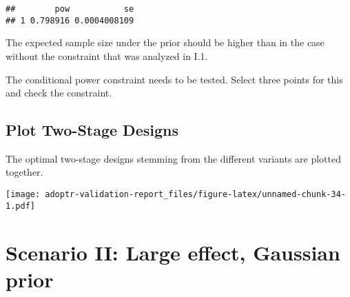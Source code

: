 \documentclass[]{book}
\newenvironment{Shaded}{\begin{snugshade}}{\end{snugshade}}
\newcommand{\ControlFlowTok}[1]{\textcolor[rgb]{0.13,0.29,0.53}{\textbf{#1}}}
\newcommand{\DecValTok}[1]{\textcolor[rgb]{0.00,0.00,0.81}{#1}}
\newcommand{\FloatTok}[1]{\textcolor[rgb]{0.00,0.00,0.81}{#1}}
\newcommand{\KeywordTok}[1]{\textcolor[rgb]{0.13,0.29,0.53}{\textbf{#1}}}
\newcommand{\NormalTok}[1]{#1}
\newcommand{\OperatorTok}[1]{\textcolor[rgb]{0.81,0.36,0.00}{\textbf{#1}}}
\newcommand{\StringTok}[1]{\textcolor[rgb]{0.31,0.60,0.02}{#1}}
\begin{document}
\begin{verbatim}
##        pow           se
## 1 0.798916 0.0004008109
\end{verbatim}

The expected sample size under the prior should be higher than
in the case without the constraint that was analyzed in I.1.

\begin{Shaded}
\end{Shaded}

The conditional power constraint needs to be tested.
Select three points for this and check the constraint.

\begin{Shaded}
\end{Shaded}

\hypertarget{plot-two-stage-designs}{%
\section{Plot Two-Stage Designs}\label{plot-two-stage-designs}}

The optimal two-stage designs stemming from the different variants
are plotted together.

\texttt{[image: adoptr-validation-report\_files/figure-latex/unnamed-chunk-34-1.pdf]}

\hypertarget{scenarioII}{%
\chapter{Scenario II: Large effect, Gaussian prior}\label{scenarioII}}
\end{document}
